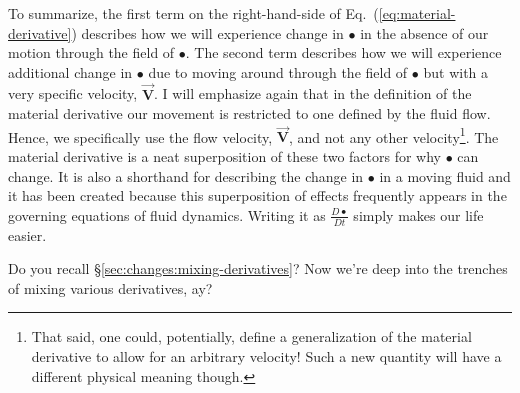 To summarize, the first term on the right-hand-side of Eq.~(\ref{eq:material-derivative}) describes how we will experience change in $\bullet$ in the absence of our motion through the field of $\bullet$. The second term describes how we will experience additional change in $\bullet$ due to moving around through the field of $\bullet$ but with a very specific velocity, $\vec{\bm{V}}$. I will emphasize again that in the definition of the material derivative our movement is restricted to one defined by the fluid flow. Hence, we specifically use the flow velocity, $\vec{\bm{V}}$, and not any other velocity\footnote{That said, one could, potentially, define a generalization of the material derivative to allow for an arbitrary velocity! Such a new quantity will have a different physical meaning though.}. The material derivative is a neat superposition of these two factors for why $\bullet$ can change. It is also a shorthand for describing the change in $\bullet$ in a moving fluid and it has been created because this superposition of effects frequently appears in the governing equations of fluid dynamics. Writing it as $\frac{D \bullet}{D t}$ simply makes our life easier.

Do you recall \S\ref{sec:changes:mixing-derivatives}? Now we're deep into the trenches of mixing various derivatives, ay?

